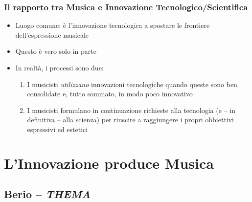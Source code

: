 \documentclass[compress]{beamer}
\begin{document}
\begin{frame}
    \frametitle{Il rapporto tra Musica e Innovazione Tecnologico/Scientifica}

    \begin{itemize}[<+- | alert@+->]
        \item Luogo comune: \`e l'innovazione tecnologica a spostare le
            frontiere dell'espressione musicale
        \item Questo \`e vero solo in parte
        \item In realt\`a, i processi sono due:
            \begin{enumerate}[<+- | alert@+->]
                \item I musicisti \emph{utilizzano} innovazioni tecnologiche
                    quando queste sono ben consolidate e, tutto sommato, in
                    modo poco innovativo
                \item I musicisti formulano in continuazione richieste alla
                    tecnologia (e -- in definitiva -- alla scienza) per
                    riuscire a raggiungere i propri obbiettivi espressivi ed
                    estetici
            \end{enumerate}
    \end{itemize}

\end{frame}

\section[Innovazione $\Rightarrow$ Musica]{L'Innovazione produce Musica}

\subsection{Berio -- {\it THEMA}}
\end{document}
